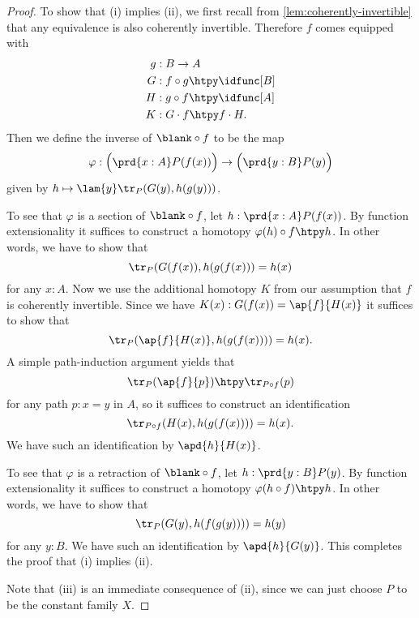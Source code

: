 \begin{proof}
To show that (i) implies (ii), we first recall from \cref{lem:coherently-invertible} that any equivalence is also coherently invertible. Therefore $f$ comes equipped with
\begin{align*}
g & : B \to A\\
G & : f\circ g \htpy \idfunc[B] \\
H & : g\circ f \htpy \idfunc[A] \\
K & : G\cdot f \htpy f\cdot H.
\end{align*}
Then we define the inverse of $\blank\circ f$ to be the map
\begin{equation*}
\varphi:\Big(\prd{x:A}P(f(x))\Big)\to\Big(\prd{y:B}P(y)\Big)
\end{equation*}
given by $h\mapsto \lam{y}\tr_P(G(y),h(g(y)))$. 

To see that $\varphi$ is a section of $\blank\circ f$, let $h:\prd{x:A}P(f(x))$. By function extensionality it suffices to construct a homotopy $\varphi(h)\circ f\htpy h$. In other words, we have to show that
\begin{equation*}
\tr_P(G(f(x)),h(g(f(x)))=h(x)
\end{equation*}
for any $x:A$. Now we use the additional homotopy $K$ from our assumption that $f$ is coherently invertible. Since we have $K(x):G(f(x))=\ap{f}{H(x)}$ it suffices to show that
\begin{equation*}
\tr_P(\ap{f}{H(x)},h(g(f(x))))=h(x).
\end{equation*}
A simple path-induction argument yields that
\begin{equation*}
\tr_P(\ap{f}{p})\htpy \tr_{P\circ f}(p)
\end{equation*}
for any path $p:x=y$ in $A$, so it suffices to construct an identification
\begin{equation*}
\tr_{P\circ f}(H(x),h(g(f(x))))=h(x).
\end{equation*}
We have such an identification by $\apd{h}{H(x)}$.

To see that $\varphi$ is a retraction of $\blank\circ f$, let $h:\prd{y:B}P(y)$. By function extensionality it suffices to construct a homotopy $\varphi(h\circ f)\htpy h$. In other words, we have to show that
\begin{equation*}
\tr_P(G(y),h(f(g(y))))=h(y)
\end{equation*}
for any $y:B$. We have such an identification by $\apd{h}{G(y)}$. This completes the proof that (i) implies (ii).

Note that (iii) is an immediate consequence of (ii), since we can just choose $P$ to be the constant family $X$.


\end{proof}
